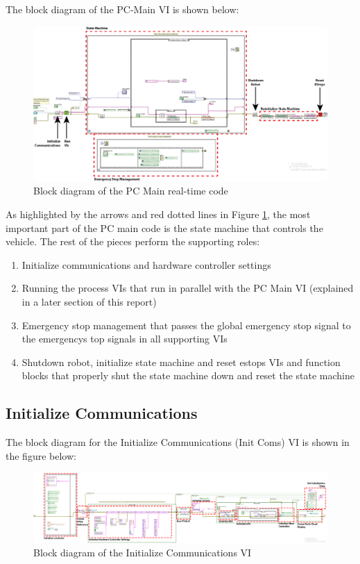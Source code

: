 \noindent The block diagram of the PC-Main VI is shown below:

\begin{figure}[h!]
\centering
\includegraphics[scale=0.35]{Photos/pcmainblock_annotated.png}
\caption{Block diagram of the PC Main real-time code}
\label{fig:pcmainblock_annotated}
\end{figure}

\noindent As highlighted by the arrows and red dotted lines in Figure \ref{fig:pcmainblock_annotated}, the most important part of the PC main code is the state machine that controls the vehicle. The rest of the pieces perform the supporting roles:

\begin{enumerate}
\item Initialize communications and hardware controller settings
\item Running the process VIs that run in parallel with the PC Main VI (explained in a later section of this report)
\item Emergency stop management that passes the global emergency stop signal to the emergencys top signals in all supporting VIs
\item Shutdown robot, initialize state machine and reset estops VIs and function blocks that properly shut the state machine down and reset the state machine
\end{enumerate}

\subsection{Initialize Communications}

The block diagram for the Initialize Communications (Init Coms) VI is shown in the figure below:

\begin{figure}[h!]
\centering
\includegraphics[scale=0.35]{Photos/initcommsblock.png}
\caption{Block diagram of the Initialize Communications VI}
\label{fig:initcommsblock}
\end{figure}

